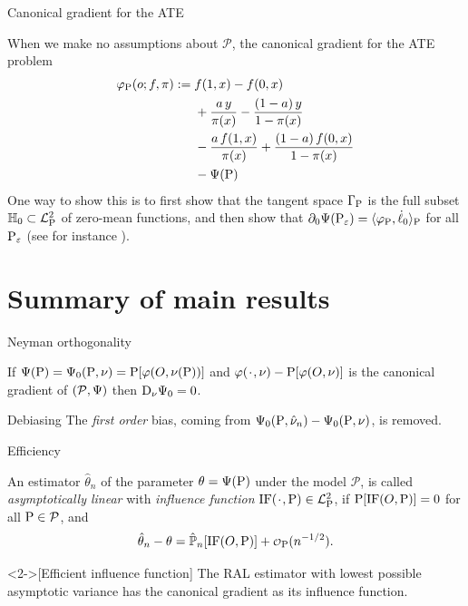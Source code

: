 \documentclass{beamer}\usepackage{listings}
\begin{document}
\begin{frame}[label={sec:org28bd024}]{Canonical gradient for the ATE}
\begin{example}[ATE]
When we make no assumptions about \(\mathcal{P}\), the canonical gradient for the ATE problem
\begin{align*}
  \phi_{\P}(o; f, \pi) := \;& f(1,x) - f(0,x) \\
                             & +  \frac{a\,y}{\pi(x)} - \frac{(1-a)\,y}{1-\pi(x)} \\
                             &  - \frac{a\,f(1,x)}{\pi(x)} +
                               \frac{(1-a)\,f(0,x)}{1-\pi(x)} \\
                             &  - \TT(\P)
\end{align*}
\pause One way to show this is to first show that the tangent space $\Gamma_{\P}$ is the full subset
$\mathbb{H}_0 \subset \lp$ of zero-mean functions, and then show that
$ \partial_0{\TT(\P_{\epsilon})} = \langle \phi_{\P}, \dot{\ell}_0 \rangle_{\P}$ for all
$\P_{\epsilon}$ (see for instance \cite{kennedy2016semiparametric}).
\end{example}
\end{frame}

\section{Summary of main results}
\label{sec:org1b22452}
\begin{frame}[label={sec:orgef00878}]{Neyman orthogonality}
\begin{theorem}
If $\TT(\P) = \TT_0(\P, \nu) = \P[\phi(O, \nu(\P))]$ and $\phi(\blank, \nu) - \P[\phi(O, \nu)]$ is the
canonical gradient of $(\mathcal{P}, \TT)$ then $\mathrm{D_{\nu}{\TT_0}} = 0$.

\hfill \pause
\end{theorem}

\begin{block}{Debiasing}
The \emph{first order} bias, coming from \(\TT_0(\P, \hat{\nu}_n) - \TT_0(\P, \nu)\), is removed. 
\end{block}
\end{frame}

\begin{frame}[label={sec:orgc490cb5}]{Efficiency}
\begin{definition}
An estimator $\hat{\theta}_n$ of the parameter $\theta = \TT(\P)$ under the model $\mathcal{P}$, is
called \textit{asymptotically linear} with \textit{influence function} $\ic(\blank, \P) \in \lp$, if 
$\P[\ic(O, \P)] = 0$ for all $\P \in \mathcal{P}$, and 
\begin{equation*}
  \hat{\theta}_n - \theta = \empmeas[\ic(O, \P)] + \smallO_{\P}(n^{-1/2}).
\end{equation*}
\end{definition}

\begin{theorem}<2->[Efficient influence function]
The RAL estimator with lowest possible asymptotic variance has the canonical gradient as its
influence function.
\end{theorem}
\end{frame}
\end{document}

